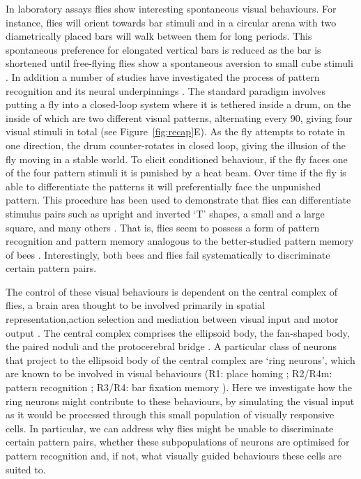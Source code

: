 \documentclass[10pt]{article}
\begin{document}
In laboratory assays flies show interesting spontaneous visual behaviours. For instance, flies will orient towards bar stimuli \cite{Reichardt1969,Gotz1987} and in a circular arena with two diametrically placed bars will walk between them for long periods. This spontaneous preference for elongated vertical bars is reduced as the bar is shortened until free-flying flies show a spontaneous aversion to small cube stimuli \cite{Maimon2008}. In addition a number of studies have investigated the process of pattern recognition and its neural underpinnings \cite{Ernst1999,Liu2006,Pan2009}. The standard paradigm involves putting a fly into a closed-loop system where it is tethered inside a drum, on the inside of which are two different visual patterns, alternating every 90\degree, giving four visual stimuli in total (see Figure~\ref{fig:recap}E). As the fly attempts to rotate in one direction, the drum counter-rotates in closed loop, giving the illusion of the fly moving in a stable world. To elicit conditioned behaviour, if the fly faces one of the four pattern stimuli it is punished by a heat beam. Over time if the fly is able to differentiate the patterns it will preferentially face the unpunished pattern. This procedure has been used to demonstrate that flies can differentiate stimulus pairs such as upright and inverted `T' shapes, a small and a large square, and many others \cite{Ernst1999}. That is, flies seem to possess a form of pattern recognition and pattern memory analogous to the better-studied pattern memory of bees \cite{vonFrisch1914,Giurfa1997,Horridge2009}. Interestingly, both bees \cite{Srinivasan1994} and flies \cite{Ernst1999} fail systematically to discriminate certain pattern pairs. 

The control of these visual behaviours is dependent on the central complex of flies, a brain area thought to be involved primarily in spatial representation,action selection and mediation between visual input and motor output \cite{Pfeiffer2014}. The central complex comprises the ellipsoid body, the fan-shaped body, the paired noduli and the protocerebral bridge \cite{Young2010}. A particular class of neurons that project to the ellipsoid body of the central complex are `ring neurons', which are known to be involved in visual behaviours (R1: place homing \cite{Sitaraman2008,Sitaraman2010,Ofstad2011}; R2/R4m: pattern recognition \cite{Ernst1999,Liu2006,Pan2009}; R3/R4: bar fixation memory \cite{Neuser2008}). Here we investigate how the ring neurons might contribute to these behaviours, by simulating the visual input as it would be processed through this small population of visually responsive cells. In particular, we can address why flies might be unable to discriminate certain pattern pairs, whether these subpopulations of neurons are optimised for pattern recognition and, if not, what visually guided behaviours these cells are suited to.
\end{document}
